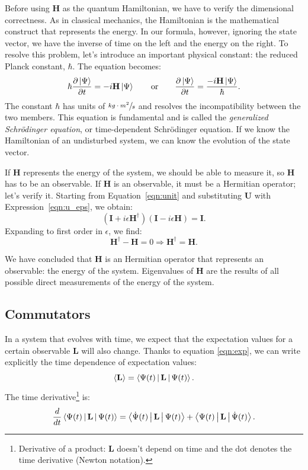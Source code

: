 Before using $\mathbf{H}$ as the quantum Hamiltonian, we have to verify the dimensional correctness. As in classical mechanics, the Hamiltonian is the mathematical construct that represents the energy. In our formula, however, ignoring the state vector, we have the inverse of time on the left and the energy on the right. To resolve this problem, let's introduce an important physical constant: the reduced Planck constant, $\hbar$.
\newpage
The equation becomes:
\begin{equation}
	\label{eqn:shro}
	\hbar\frac{\partial\Ket{\Psi}}{\partial t} = - i \mathbf{H}\Ket{\Psi}
	\qquad \text{or} \qquad
	\frac{\partial\Ket{\Psi}}{\partial t} = \frac{- i \mathbf{H}\Ket{\Psi}}{\hbar}.
\end{equation}
The constant $\hbar$ has units of $\sfrac{kg\cdot m^2}{s}$ and resolves the incompatibility between the two members. This equation is fundamental and is called the \emph{generalized Schrödinger equation}, or time-dependent Schrödinger equation. If we know the Hamiltonian of an undisturbed system, we can know the evolution of the state vector.

If $\mathbf{H}$ represents the energy of the system, we should be able to measure it, so $\mathbf{H}$ has to be an observable. If $\mathbf{H}$ is an observable, it must be a Hermitian operator; let's verify it. Starting from Equation~\ref{eqn:unit} and substituting $\mathbf{U}$ with Expression~\ref{eqn:u_eps}, we obtain:
\[
(\mathbf{I} + i\epsilon\mathbf{H}^\dagger) (\mathbf{I} - i\epsilon\mathbf{H}) = \mathbf{I}.
\]
Expanding to first order in $\epsilon$, we find:
\[
\mathbf{H}^\dagger - \mathbf{H} = 0 \Rightarrow \mathbf{H}^\dagger = \mathbf{H}.
\]

We have concluded that $\mathbf{H}$ is an Hermitian operator that represents an observable: the energy of the system. Eigenvalues of $\mathbf{H}$ are the results of all possible direct measurements of the energy of the system. 

\subsection{Commutators}
In a system that evolves with time, we expect that the expectation values for a certain observable $\mathbf{L}$ will also change. Thanks to equation \vref{eqn:exp}, we can write explicitly the time dependence of expectation values:
\[
\Braket{\mathbf{L}} = \Braket{\Psi(t)|\mathbf{L}|\Psi(t)}.
\]
The time derivative\footnote{Derivative of a product: $\mathbf{L}$ doesn't depend on time and the dot denotes the time derivative (Newton notation).} is:
\[
\frac{d}{dt}\Braket{\Psi(t)|\mathbf{L}|\Psi(t)} = \Braket{\dot{\Psi}(t)|\mathbf{L}|\Psi(t)} + \Braket{\Psi(t)|\mathbf{L}|\dot{\Psi}(t)}.
\]

